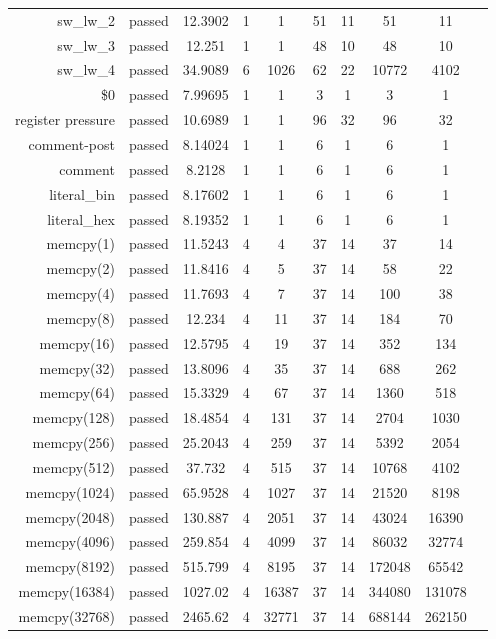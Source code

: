 \begin{longtable}{r|ccccccccc}
    sw\_lw\_2 & passed & 12.3902 & 1 & 1 & 51 & 11 & 51 & 11 \\
    sw\_lw\_3 & passed & 12.251 & 1 & 1 & 48 & 10 & 48 & 10 \\
    sw\_lw\_4 & passed & 34.9089 & 6 & 1026 & 62 & 22 & 10772 & 4102 \\
    \$0 & passed & 7.99695 & 1 & 1 & 3 & 1 & 3 & 1 \\
    register pressure & passed & 10.6989 & 1 & 1 & 96 & 32 & 96 & 32 \\
    comment-post & passed & 8.14024 & 1 & 1 & 6 & 1 & 6 & 1 \\
    comment & passed & 8.2128 & 1 & 1 & 6 & 1 & 6 & 1 \\
    literal\_bin & passed & 8.17602 & 1 & 1 & 6 & 1 & 6 & 1 \\
    literal\_hex & passed & 8.19352 & 1 & 1 & 6 & 1 & 6 & 1 \\
    memcpy(1) & passed & 11.5243 & 4 & 4 & 37 & 14 & 37 & 14 \\
    memcpy(2) & passed & 11.8416 & 4 & 5 & 37 & 14 & 58 & 22 \\
    memcpy(4) & passed & 11.7693 & 4 & 7 & 37 & 14 & 100 & 38 \\
    memcpy(8) & passed & 12.234 & 4 & 11 & 37 & 14 & 184 & 70 \\
    memcpy(16) & passed & 12.5795 & 4 & 19 & 37 & 14 & 352 & 134 \\
    memcpy(32) & passed & 13.8096 & 4 & 35 & 37 & 14 & 688 & 262 \\
    memcpy(64) & passed & 15.3329 & 4 & 67 & 37 & 14 & 1360 & 518 \\
    memcpy(128) & passed & 18.4854 & 4 & 131 & 37 & 14 & 2704 & 1030 \\
    memcpy(256) & passed & 25.2043 & 4 & 259 & 37 & 14 & 5392 & 2054 \\
    memcpy(512) & passed & 37.732 & 4 & 515 & 37 & 14 & 10768 & 4102 \\
    memcpy(1024) & passed & 65.9528 & 4 & 1027 & 37 & 14 & 21520 & 8198 \\
    memcpy(2048) & passed & 130.887 & 4 & 2051 & 37 & 14 & 43024 & 16390 \\
    memcpy(4096) & passed & 259.854 & 4 & 4099 & 37 & 14 & 86032 & 32774 \\
    memcpy(8192) & passed & 515.799 & 4 & 8195 & 37 & 14 & 172048 & 65542 \\
    memcpy(16384) & passed & 1027.02 & 4 & 16387 & 37 & 14 & 344080 & 131078 \\
    memcpy(32768) & passed & 2465.62 & 4 & 32771 & 37 & 14 & 688144 & 262150 \\

\end{longtable}
